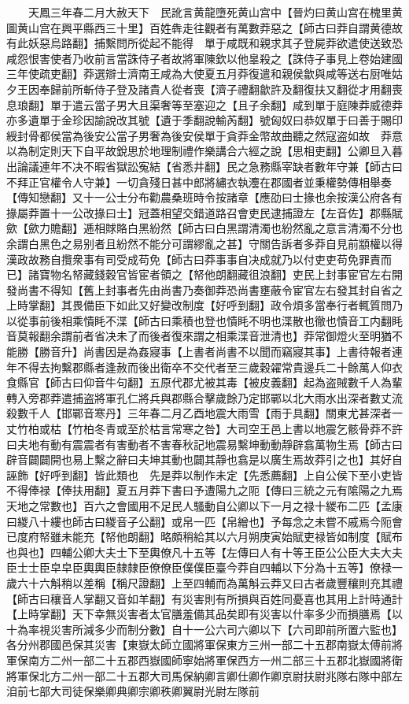 　　天鳳三年春二月大赦天下　民訛言黄龍墮死黄山宫中【晉灼曰黄山宫在槐里黄圖黄山宫在興平縣西三十里】百姓犇走往觀者有萬數莽惡之【師古曰莽自謂黄德故有此妖惡烏路翻】捕繫問所從起不能得　單于咸既和親求其子登屍莽欲遣使送致恐咸怨恨害使者乃收前言當誅侍子者故將軍陳欽以他辠殺之【誅侍子事見上卷始建國三年使疏吏翻】莽選辯士濟南王咸為大使夏五月莽復遣和親侯歙與咸等送右厨唯姑夕王因奉歸前所斬侍子登及諸貴人從者喪【濟子禮翻歙許及翻復扶又翻從才用翻喪息琅翻】單于遣云當子男大且渠奢等至塞迎之【且子余翻】咸到單于庭陳莽威德莽亦多遺單于金珍因諭說改其號【遺于季翻說輸芮翻】號匈奴曰恭奴單于曰善于賜印綬封骨都侯當為後安公當子男奢為後安侯單于貪莽金幣故曲聽之然寇盗如故　莽意以為制定則天下自平故銳思於地理制禮作樂講合六經之說【思相吏翻】公卿旦入暮出論議連年不决不暇省獄訟寃結【省悉井翻】民之急務縣宰缺者數年守兼【師古曰不拜正官權令人守兼】一切貪殘日甚中郎將繡衣執灋在郡國者並秉權勢傳相舉奏【傳知戀翻】又十一公士分布勸農桑班時令按諸章【應劭曰士掾也余按漢公府各有掾屬莽置十一公改掾曰士】冠蓋相望交錯道路召會吏民逮捕證左【左音佐】郡縣賦歛【歛力贍翻】逓相賕賂白黑紛然【師古曰白黑謂清濁也紛然亂之意言清濁不分也余謂白黑色之易别者且紛然不能分可謂繆亂之甚】守關告訴者多莽自見前顓權以得漢政故務自攬衆事有司受成苟免【師古曰莽事事自决成就乃以付吏吏苟免罪責而已】諸寶物名帑藏錢穀官皆宦者領之【帑他朗翻藏徂浪翻】吏民上封事宦官左右開發尚書不得知【舊上封事者先由尚書乃奏御莽恐尚書壅蔽令宦官左右發其封自省之上時掌翻】其畏備臣下如此又好變改制度【好呼到翻】政令煩多當奉行者輒質問乃以從事前後相乘憒眊不渫【師古曰乘積也登也憒眊不明也渫散也徹也憒音工内翻眊音莫報翻余謂前者省决未了而後者復來謂之相乘渫音泄清也】莽常御燈火至明猶不能勝【勝音升】尚書因是為姦寢事【上書者尚書不以聞而竊寢其事】上書待報者連年不得去拘繫郡縣者逢赦而後出衛卒不交代者至三歲穀糴常貴邊兵二十餘萬人仰衣食縣官【師古曰仰音牛句翻】五原代郡尤被其毒【被皮義翻】起為盗賊數千人為輩轉入旁郡莽遣捕盗將軍孔仁將兵與郡縣合擊歲餘乃定邯鄲以北大雨水出深者數丈流殺數千人【邯鄲音寒丹】三年春二月乙酉地震大雨雪【雨于具翻】關東尤甚深者一丈竹柏或枯【竹柏冬青或至於枯言常寒之咎】大司空王邑上書以地震乞骸骨莽不許曰夫地有動有震震者有害動者不害春秋記地震易繫坤動動靜辟翕萬物生焉【師古曰辟音闢闢開也易上繫之辭曰夫坤其動也闢其靜也翕是以廣生焉故莽引之也】其好自誣飾【好呼到翻】皆此類也　先是莽以制作未定【先悉薦翻】上自公侯下至小吏皆不得俸禄【俸扶用翻】夏五月莽下書曰予遭陽九之阨【傳曰三統之元有隂陽之九焉天地之常數也】百六之會國用不足民人騷動自公卿以下一月之禄十緵布二匹【孟康曰緵八十縷也師古曰緵音子公翻】或帛一匹【帛繒也】予每念之未嘗不戚焉今阨會已度府帑雖未能充【帑他朗翻】略頗稍給其以六月朔庚寅始賦吏禄皆如制度【賦布也與也】四輔公卿大夫士下至輿僚凡十五等【左傳曰人有十等王臣公公臣大夫大夫臣士士臣皁皁臣輿輿臣隸隸臣僚僚臣僕僕臣臺今莽自四輔以下分為十五等】僚禄一歲六十六斛稍以差稱【稱尺證翻】上至四輔而為萬斛云莽又曰古者歲豐穰則充其禮【師古曰穰音人掌翻又音如羊翻】有災害則有所損與百姓同憂喜也其用上計時通計【上時掌翻】天下幸無災害者太官膳羞備其品矣即有災害以什率多少而損膳焉【以十為率視災害所減多少而制分數】自十一公六司六卿以下【六司即前所置六監也】各分州郡國邑保其災害【東嶽太師立國將軍保東方三州一部二十五郡南嶽太傅前將軍保南方二州一部二十五郡西嶽國師寧始將軍保西方一州二部三十五郡北嶽國將衛將軍保北方二州一部二十五郡大司馬保納卿言卿仕卿作卿京尉扶尉兆隊右隊中部左洎前七部大司徒保樂卿典卿宗卿秩卿翼尉光尉左隊前